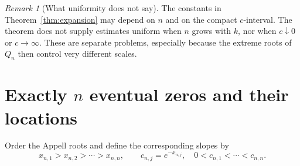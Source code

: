 \documentclass[11pt]{article}
\theoremstyle{definition}
\theoremstyle{remark}
\newtheorem{remark}[theorem]{Remark}
\begin{document}
\begin{remark}[What uniformity does not say]
The constants in Theorem~\ref{thm:expansion} may depend on $n$ and on the compact $c$-interval. The theorem does not supply estimates uniform when $n$ grows with $k$, nor when $c\downarrow0$ or $c\to\infty$. These are separate problems, especially because the extreme roots of $Q_n$ then control very different scales.
\end{remark}

\section{Exactly \texorpdfstring{$n$}{n} eventual zeros and their locations}
\label{sec:zerolocations}

Order the Appell roots and define the corresponding slopes by
\begin{equation}\label{eq:slopes}
 x_{n,1}>x_{n,2}>\cdots>x_{n,n},\qquad
 c_{n,j}=e^{-x_{n,j}},
 \quad 0<c_{n,1}<\cdots<c_{n,n}.
\end{equation}
\end{document}
